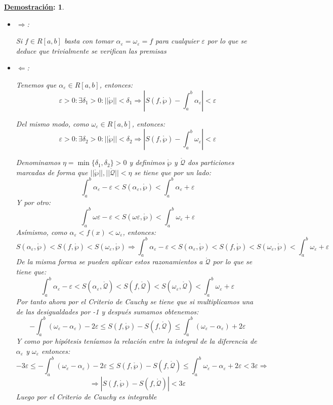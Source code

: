 \documentclass[10pt,a4paper,openright]{book}
\theoremstyle{break}
\newtheorem*{demo}{\underline{Demostración}:}
\begin{document}
\begin{demo}
\begin{itemize}
\item $\Rightarrow $:

Si $f\in R[a,b]$ basta con tomar $\alpha_\varepsilon = \omega_\varepsilon = f$ para cualquier $\varepsilon$ por lo que se deduce que trivialmente se verifican las premisas

\item $\Leftarrow$:

Tenemos que $\alpha_\varepsilon\in R[a,b]$, entonces:
$$\varepsilon > 0 :\exists \delta_1 >0: ||\mathring{\wp}||<\delta_1\Rightarrow \left|S(f,\mathring{\wp})-\int_{a}^{b}\alpha_\varepsilon \right|<\varepsilon$$

Del mismo modo, como $\omega_\varepsilon\in R[a,b]$, entonces:
$$\varepsilon >0: \exists \delta_2>0 : ||\mathring{\wp}||<\delta_2\Rightarrow \left|S(f,\mathring{\wp})- \int_{a}^{b}\omega_\varepsilon \right| <\varepsilon$$

Denominamos $\eta = \min\{\delta_1, \delta_2\} >0$ y definimos $\mathring{\wp}$ y $\mathring{\mathcal{Q}}$ dos particiones marcadas de forma que $||\mathring{\wp}||,||\mathring{\mathcal{Q}}||<\eta$ se tiene que por un lado:
$$\int_{a}^{b}\alpha_\varepsilon -\varepsilon < S(\alpha_\varepsilon, \mathring{\wp}) < \int_{a}^{b}\alpha_\varepsilon + \varepsilon$$
Y por otro:
$$\int_{a}^{b}\omega\varepsilon -\varepsilon < S(\omega\varepsilon, \mathring{\wp}) < \int_{a}^{b}\omega_\varepsilon + \varepsilon$$
Asímismo, como $\alpha_\varepsilon < f(x)< \omega_\varepsilon$, entonces:
$$S(\alpha_\varepsilon, \mathring{\wp}) < S(f,\mathring{\wp}) < S(\omega_\varepsilon, \mathring{\wp})\Rightarrow \int_{a}^{b}\alpha_\varepsilon - \varepsilon < S(\alpha_\varepsilon, \mathring{\wp}) < S(f,\mathring{\wp}) < S(\omega_\varepsilon, \mathring{\wp}) < \int_{a}^{b}\omega_\varepsilon + \varepsilon$$
De la misma forma se pueden aplicar estos razonamientos a $\mathring{\mathcal{Q}}$ por lo que se tiene que:
$$\int_{a}^{b}\alpha_\varepsilon - \varepsilon < S(\alpha_\varepsilon, \mathring{\mathcal{Q}}) < S(f,\mathring{\mathcal{Q}}) < S(\omega_\varepsilon, \mathring{\mathcal{Q}}) < \int_{a}^{b}\omega_\varepsilon + \varepsilon$$
Por tanto ahora por el Criterio de Cauchy se tiene que si multiplicamos una de las desigualdades por -1 y después sumamos obtenemos:
$$-\int_{a}^{b}(\omega_\varepsilon - \alpha_\varepsilon)-2\varepsilon \leq S(f,\mathring{\wp})- S(f,\mathring{\mathcal{Q}})\leq \int_{a}^{b}(\omega_\varepsilon - \alpha_\varepsilon) + 2\varepsilon$$
Y como por hipótesis teníamos la relación entre la integral de la diferencia de $\alpha_\varepsilon$ y $\omega_\varepsilon$ entonces:
$$-3 \varepsilon\leq -\int_{a}^{b}(\omega_\varepsilon - \alpha_\varepsilon)-2\varepsilon \leq S(f,\mathring{\wp})- S(f,\mathring{\mathcal{Q}})\leq \int_{a}^{b}\omega_\varepsilon - \alpha_\varepsilon + 2\varepsilon < 3\varepsilon\Rightarrow$$
$$\Rightarrow \left|S(f,\mathring{\wp})- S(f,\mathring{\mathcal{Q}})\right| < 3\varepsilon$$
Luego por el Criterio de Cauchy es integrable
\end{itemize}
\end{demo}
\end{document}
